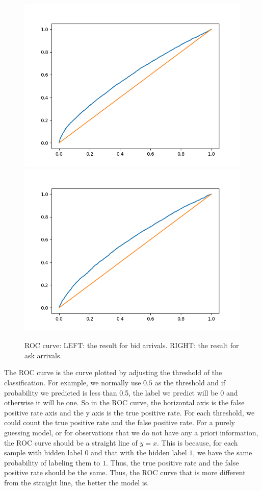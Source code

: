 \documentclass[letterpaper,12pt]{article}
\numberwithin{equation}{section}
\begin{document}
\begin{figure}
    \centering
    \includegraphics[scale=0.4]{figs/bid_roc.png}
    \includegraphics[scale=0.4]{figs/ask_roc.png}
    \caption{\small ROC curve: LEFT: the result for bid arrivals. RIGHT: the result for ask arrivals.}
    \label{sec2:fig:ROC}
\end{figure}

The ROC curve is the curve plotted by adjusting the threshold of the classification. For example, we normally use $0.5$ as the threshold and if probability we predicted is less than 0.5, the label we predict will be 0 and otherwise it will be one. So in the ROC curve, the horizontal axis is the false positive rate axis and the y axis is the true positive rate. For each threshold, we could count the true positive rate and the false positive rate. For a purely guessing model, or for observations that we do not have any a priori information, the ROC curve should be a straight line of $y=x$. This is because, for each sample with hidden label $0$ and that with the hidden label $1$, we have the same probability of labeling them to $1$. Thus, the true positive rate and the false positive rate should be the same. Thus, the ROC curve that is more different from the straight line, the better the model is. 
\end{document}
